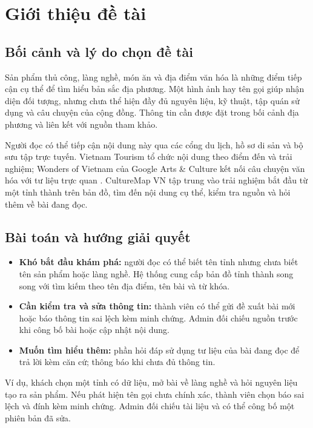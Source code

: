 \section{Giới thiệu đề tài}
\label{sec:overview}
\begingroup
{}
\setlength{\parskip}{4pt}

\subsection{Bối cảnh và lý do chọn đề tài}
Sản phẩm thủ công, làng nghề, món ăn và địa điểm văn hóa là những điểm tiếp
cận cụ thể để tìm hiểu bản sắc địa phương. Một hình ảnh hay tên gọi giúp
nhận diện đối tượng, nhưng chưa thể hiện đầy đủ nguyên liệu, kỹ thuật,
tập quán sử dụng và câu chuyện của cộng đồng. Thông tin cần được đặt trong
bối cảnh địa phương và liên kết với nguồn tham khảo.

Người đọc có thể tiếp cận nội dung này qua các cổng du lịch, hồ sơ di sản
và bộ sưu tập trực tuyến. Vietnam Tourism tổ chức nội dung theo điểm đến
và trải nghiệm; Wonders of Vietnam của Google Arts \& Culture kết nối
câu chuyện văn hóa với tư liệu trực quan \cite{vietnam-culture,google-wonders}.
CultureMap VN tập trung vào trải nghiệm bắt đầu từ một tỉnh thành trên bản
đồ, tìm đến nội dung cụ thể, kiểm tra nguồn và hỏi thêm về bài đang đọc.

\subsection{Bài toán và hướng giải quyết}
\begin{itemize}
  \item \textbf{Khó bắt đầu khám phá:} người đọc có thể biết tên tỉnh nhưng
  chưa biết tên sản phẩm hoặc làng nghề. Hệ thống cung cấp bản đồ tỉnh thành
  song song với tìm kiếm theo tên địa điểm, tên bài và từ khóa.
  \item \textbf{Cần kiểm tra và sửa thông tin:} thành viên có thể gửi đề xuất
  bài mới hoặc báo thông tin sai lệch kèm minh chứng. Admin đối chiếu nguồn
  trước khi công bố bài hoặc cập nhật nội dung.
  \item \textbf{Muốn tìm hiểu thêm:} phần hỏi đáp sử dụng tư liệu của bài
  đang đọc để trả lời kèm căn cứ; thông báo khi chưa đủ thông tin.
\end{itemize}

Ví dụ, khách chọn một tỉnh có dữ liệu, mở bài về làng nghề và hỏi nguyên
liệu tạo ra sản phẩm. Nếu phát hiện tên gọi chưa chính xác, thành viên
chọn báo sai lệch và đính kèm minh chứng. Admin đối chiếu tài liệu và có
thể công bố một phiên bản đã sửa.

